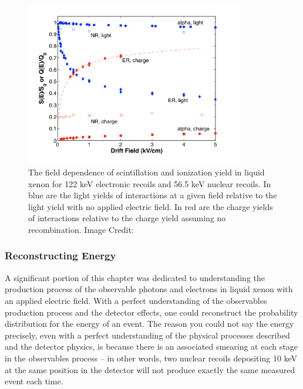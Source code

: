 \begin{figure}[t]
	\centering
	\includegraphics[width=0.85\textwidth]{field_dependence_nr_er}
	\caption{The field dependence of scintillation and ionization yield in liquid xenon for 122 keV electronic recoils and 56.5 keV nuclear recoils.  In blue are the light yields of interactions at a given field relative to the light yield with no applied electric field.  In red are the charge yields of interactions relative to the charge yield assuming no recombination.  Image Credit: }
	\label{fig:field_dependence_nr_er}
\end{figure}


\subsubsection{Reconstructing Energy}

A significant portion of this chapter was dedicated to understanding the production process of the observable photons and electrons in liquid xenon with an applied electric field.  With a perfect understanding of the observables production process and the detector effects, one could reconstruct the probability distribution for the energy of an event.  The reason you could not say the energy precisely, even with a perfect understanding of the physical processes described and the detector physics,  is because there is an associated smearing at each stage in the observables process -- in other words, two nuclear recoils depositing 10 keV at the same position in the detector will not produce exactly the same measured event each time.  


